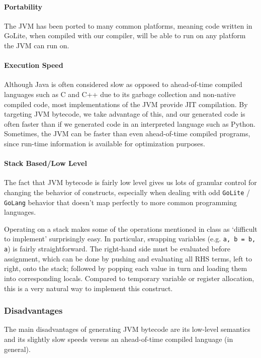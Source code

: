 \documentclass[11pt]{article}
\begin{document}
\paragraph{Portability}%
\label{sec:portability}
The JVM has been ported to many common platforms, meaning code written
in GoLite, when compiled with our compiler, will be able to run on any
platform the JVM can run on.
\paragraph{Execution Speed}%
\label{sec:execs}
Although Java is often considered slow as opposed to ahead-of-time
compiled languages such as C and C++ due to its garbage collection and
non-native compiled code, most implementations of the JVM provide JIT
compilation. By targeting JVM bytecode, we take advantage of
this, and our generated code is often faster than if we
generated code in an interpreted language such as Python. Sometimes,
the JVM can be faster than even ahead-of-time compiled programs, since
run-time information is available for optimization purposes.
\paragraph{Stack Based/Low Level}%
\label{sec:stack}
The fact that JVM bytecode is fairly low level gives us lots of
granular control for changing the behavior of constructs, especially
when dealing with odd \texttt{GoLite} / \texttt{GoLang} behavior that
doesn't map perfectly to more common programming languages.

Operating on a stack makes some of the operations mentioned in class
as `difficult to implement' surprisingly easy. In particular, swapping
variables (e.g. \texttt{a, b = b, a}) is fairly straightforward. The
right-hand side must be evaluated before assignment, which can be done
by pushing and evaluating all RHS terms, left to right, onto the
stack; followed by popping each value in turn and loading them into
corresponding locals. Compared to temporary variable or register
allocation, this is a very natural way to implement this construct.

\subsubsection{Disadvantages}
The main disadvantages of generating JVM bytecode are its low-level
semantics and its slightly slow speeds versus an
ahead-of-time compiled language (in general).
\end{document}
